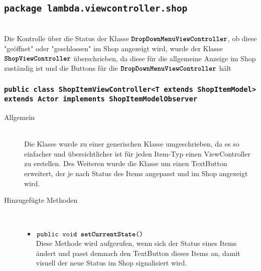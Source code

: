 \subsection{\texttt{package lambda.viewcontroller.shop}}

\item[Allgemein] \hfill \\ Die Kontrolle über die Status der Klasse $\texttt{\textbf{DropDownMenuViewController}}$, ob diese "geöffnet" oder "geschlossen" im Shop angezeigt wird, wurde der Klasse $\texttt{\textbf{ShopViewController}}$ überschrieben, da diese für die allgemeine Anzeige im Shop zuständig ist und die Buttons für die $\texttt{\textbf{DropDownMenuViewController}}$ hält


\subsubsection{\normalfont \texttt{public class \textbf{ShopItemViewController}<T extends ShopItemModel> extends Actor implements ShopItemModelObserver}}

\begin{description}

\item[Allgemein] \hfill \\ Die Klasse wurde zu einer generischen Klasse umgeschrieben, da es so einfacher und übersichtlicher ist für jeden Item-Typ einen ViewController zu erstellen. Des Weiteren wurde die Klasse um einen TextButton erweitert, der je nach Status des Items angepasst und im Shop angezeigt wird.

\item[Hinzugefügte Methoden] \hfill \\
	\vspace{-.8cm}
	\begin{itemize}
		\item $\texttt{public void \textbf{setCurrentState}()}$ \\ Diese Methode wird aufgerufen, wenn sich der Status eines Items ändert und passt demnach den TextButton dieses Items an, damit visuell der neue Status im Shop signalisiert wird.
\end{itemize}
\end{description}